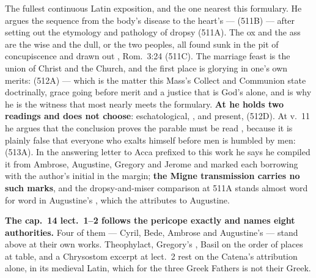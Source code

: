 \begin{witnessnote}
The fullest continuous Latin exposition, and the one nearest this
formulary. He argues the sequence from the body's disease to the heart's ---
(511B) --- after setting out the etymology and pathology of dropsy (511A). The
ox and the ass are the wise and the dull, or the two peoples, all found sunk in
the pit of concupiscence and drawn out , Rom.~3:24 (511C). The marriage feast is the union of Christ and the
Church, and the first place is glorying in one's own merits:  (512A) --- which is the
matter this Mass's Collect and Communion state doctrinally, grace going before
merit and a justice that is God's alone, and is why he is the witness that most
nearly meets the formulary. \textbf{At 
he holds two readings and does not choose}: eschatological, , and present, 
(512D). At v.~11 he argues that the conclusion proves the parable must be read
, because it is plainly false that everyone who exalts himself
before men is humbled by men:  (513A). In the answering letter to Acca prefixed to this
work he says he compiled it from Ambrose, Augustine, Gregory and Jerome and
marked each borrowing with the author's initial in the margin; \textbf{the
Migne transmission carries no such marks}, and the dropsy-and-miser comparison at 511A stands almost word for word
in Augustine's , which the  attributes to
Augustine.
\end{witnessnote}

\textbf{The  cap.~14 lect.~1--2 follows the pericope
exactly and names eight authorities.} Four of them --- Cyril, Bede, Ambrose and
Augustine's  --- stand above at their own works.
Theophylact, Gregory's , Basil on the order of places at table,
and a Chrysostom excerpt at lect.~2 rest on the Catena's attribution alone, in its
medieval Latin, which for the three Greek Fathers is not their Greek.

